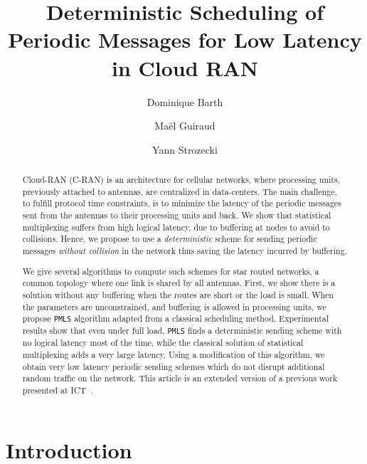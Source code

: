 \documentclass[a4paper,10pt]{article}
\title{Deterministic Scheduling of Periodic Messages for Low Latency in Cloud RAN}
\author[1]{Dominique Barth}
\author[1,2]{Ma\"el Guiraud}
\author[1]{Yann Strozecki}
\affil[1]{David Laboratory, UVSQ}
\affil[2]{Nokia Bell Labs France}
\newcommand\PMLS{\texttt{PMLS}\xspace}
\begin{document}
\maketitle

\begin{abstract}
Cloud-RAN (C-RAN) is an architecture for cellular networks, where processing units, previously attached to antennas, are centralized in data-centers. The main challenge, to fulfill protocol time constraints, is to minimize the latency of the periodic messages sent from the antennas to their processing units and back. We show that statistical multiplexing suffers from high logical latency, due to buffering at nodes to avoid to collisions. Hence, we propose to use a \emph{deterministic} scheme for sending periodic messages \emph{without collision} in the network thus saving the latency incurred by buffering.

We give several algorithms to compute such schemes for star routed networks, a common topology where one link is shared by all antennas. First, we show there is a solution without any buffering when the routes are short or the load is small. When the parameters are unconstrained, and buffering is allowed in processing units, we propose \PMLS algorithm adapted from a classical scheduling method. Experimental results show that even under full load,  \PMLS finds a deterministic sending scheme with no logical latency most of the time, while the classical solution of statistical multiplexing adds a very large latency. Using a modification of this algorithm, we obtain very low latency periodic sending schemes which do not disrupt additional random traffic on the network. This article is an extended version of a previous work presented at ICT~\cite{Guir1806:Deterministic}.
\end{abstract}


\section{Introduction}
\end{document}
